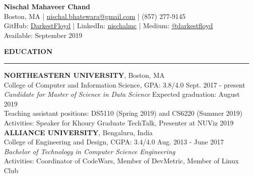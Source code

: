 \documentclass[a4paper]{article}
\newcommand{\myline}{\par
  \kern2pt %
  \hrule height 0.5pt
  \kern2pt %
}
\begin{document}
	\begin{center}
		{\Large \textbf{Nischal Mahaveer Chand}} \\
    Boston, MA | \href{mailto:nischal.bhatewara@gmail.com}{nischal.bhatewara@gmail.com} | 
    (857) 277-9145 \\
                GitHub: \href{https://github.com/DarkestFloyd}{DarkestFloyd} | 
                LinkedIn: \href{https://www.linkedin.com/in/nischalmc}{nischalmc} |
		Medium: \href{https://medium.com/@darkestfloyd}{@darkestfloyd} \\
		Available: September 2019 \\
	\end{center}
	
	\noindent
	{\large \textbf{EDUCATION}}
	\myline 
	\smallskip
	
	\noindent
	\textbf{NORTHEASTERN UNIVERSITY}, Boston, MA \\
	College of Computer and Information Science, GPA: 3.8/4.0 
        \hfill Sept. 2017 - present \\
	\textit{Candidate for Master of Science in Data Science} 
        \hfill Expected graduation: August 2019 \\
  Teaching assistant positions: DS5110 (Spring 2019) and CS6220 (Summer 2019) \\
  Activities: Speaker for Khoury Graduate TechTalk, Presenter at NUViz 2019 	\\

	\noindent
	\textbf{ALLIANCE UNIVERSITY}, Bengaluru, India \\
  College of Engineering and Design, CGPA: 3.4/4.0 \hfill Aug. 2013 - June 2017 \\
	\textit{Bachelor of Technology in Computer Science Engineering} \\
	Activities: Coordinator of CodeWars, Member of DevMetric, Member of Linux 
        Club \\
	
\end{document}
